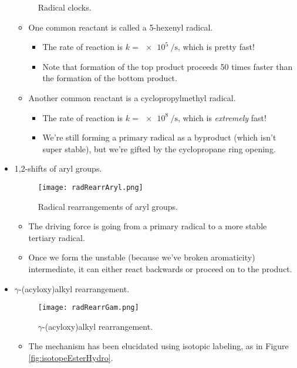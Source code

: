 \documentclass[../notes.tex]{subfiles}
\begin{document}
\begin{itemize}
\begin{figure}[h!]
\begin{subfigure}[b]{0.4\linewidth}
        \end{subfigure}
        \caption{Radical clocks.}
        \label{fig:radClock}
    \end{figure}
    \begin{itemize}
        \item One common reactant is called a 5-hexenyl radical.
        \begin{itemize}
            \item The rate of reaction is $k=\SI{e5}{\per\second}$, which is pretty fast!
            \item Note that formation of the top product proceeds 50 times faster than the formation of the bottom product.
        \end{itemize}
        \item Another common reactant is a cyclopropylmethyl radical.
        \begin{itemize}
            \item The rate of reaction is $k=\SI{e8}{\per\second}$, which is \emph{extremely} fast!
            \item We're still forming a primary radical as a byproduct (which isn't super stable), but we're gifted  by the cyclopropane ring opening.
        \end{itemize}
    \end{itemize}
    \item 1,2-shifts of aryl groups.
    \begin{figure}[h!]
        \centering
        \texttt{[image: radRearrAryl.png]}
        \caption{Radical rearrangements of aryl groups.}
        \label{fig:radRearrAryl}
    \end{figure}
    \begin{itemize}
        \item The driving force is going from a primary radical to a more stable tertiary radical.
        \item Once we form the unstable (because we've broken aromaticity) intermediate, it can either react backwards or proceed on to the product.
    \end{itemize}
    \item $\gamma$-(acyloxy)alkyl rearrangement.
    \begin{figure}[h!]
        \centering
        \texttt{[image: radRearrGam.png]}
        \caption{$\gamma$-(acyloxy)alkyl rearrangement.}
        \label{fig:radRearrGam}
    \end{figure}
    \begin{itemize}
        \item The mechanism has been elucidated using \ce{{}^18\fO} isotopic labeling, as in Figure \ref{fig:isotopeEsterHydro}.
    \end{itemize}
\end{itemize}
\end{document}
